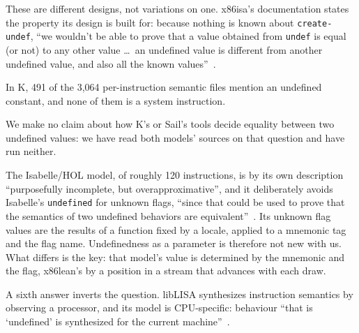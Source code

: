 \documentclass[runningheads]{llncs}
\newcommand{\src}[1]{}  %
\newcommand{\lean}[1]{\texttt{#1}}
\begin{document}
These are different designs, not variations on one. x86isa's documentation states the property its
design is built for: because nothing is known about \lean{create-undef}, ``we wouldn't be able to prove
that a value obtained from \lean{undef} is equal (or not) to any other value \ldots\ an undefined value
is different from another undefined value, and also all the known values''~\cite{x86isa-repo}.
\src{docs/TACAS-G1-POSITIONING.md 1c.10, verbatim from the :long of defsection characterizing-undefined-behavior (register-readers-and-writers.lisp:1439), beside create-undef}
In K, 491 of the 3{,}064 per-instruction semantic files mention an undefined constant, and none of
them is a system instruction.
\src{docs/CLAIMS.tsv[k\_undef\_files, k\_perinst\_files]; docs/TACAS-G1-POSITIONING.md 1c.6: the denominator is the five directories K's README names as
holding per-instruction semantics; files naming undefMInt or undefBool, re-derived at K 592380a: register 155, memory 227, immediate 109, system 0
(six more register files carry the string undef only in metadata comments, which G1's 497 counted)}
We make no claim about how K's or Sail's tools decide equality between two undefined values: we have
read both models' sources on that question and have run neither.
\src{docs/TACAS-G2-SECTION-DRAFT.md 5: measured at both sources, unrun against K}
The Isabelle/HOL model, of roughly 120 instructions, is by its own description ``purposefully
incomplete, but overapproximative'', and it deliberately avoids Isabelle's \lean{undefined} for unknown flags, ``since that
could be used to prove that the semantics of two undefined behaviors are equivalent''~\cite{afp-x86}.
Its unknown flag values are the results of a function fixed by a locale, applied to a mnemonic tag and
the flag name. Undefinedness as a parameter is therefore not new with us. What differs is the key: that
model's value is determined by the mnemonic and the flag, x86lean's by a position in a stream that
advances with each draw.
\src{docs/CLAIMS.tsv[afp\_instructions]; isa-afp.org/entries/X86\_Semantics.html and X86\_InstructionSemantics, locale unknowns, read
2026-09-12, and its fall-through branches (else undefined) and tags (unknown\_flags ''ADD'' f, ''logic'') re-read 2026-10-14; docs/TACAS-G1-POSITIONING.md 1d; D220}
A sixth answer inverts the question. libLISA synthesizes instruction semantics by observing a processor,
and its model is CPU-specific: behaviour ``that is `undefined' is synthesized for the current
machine''~\cite{liblisa}.
\src{docs/LIBLISA-HARDWARE-CHECK-2026-09-12.md; docs/DECISIONS.md D221}
\end{document}
